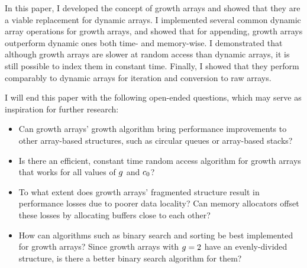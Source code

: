In this paper, I developed the concept of growth arrays and showed that they are a viable replacement for dynamic arrays. I implemented several common dynamic array operations for growth arrays, and showed that for appending, growth arrays outperform dynamic ones both time- and memory-wise. I demonstrated that although growth arrays are slower at random access than dynamic arrays, it is still possible to index them in constant time. Finally, I showed that they perform comparably to dynamic arrays for iteration and conversion to raw arrays.

I will end this paper with the following open-ended questions, which may serve as inspiration for further research:

\begin{itemize}
	\item Can growth arrays' growth algorithm bring performance improvements to other array-based structures, such as circular queues or array-based stacks?
	\item Is there an efficient, constant time random access algorithm for growth arrays that works for all values of $g$ and $c_0$?
	\item To what extent does growth arrays' fragmented structure result in performance losses due to poorer data locality? Can memory allocators offset these losses by allocating buffers close to each other?
	\item How can algorithms such as binary search and sorting be best implemented for growth arrays? Since growth arrays with $g = 2$ have an evenly-divided structure, is there a better binary search algorithm for them?
\end{itemize}